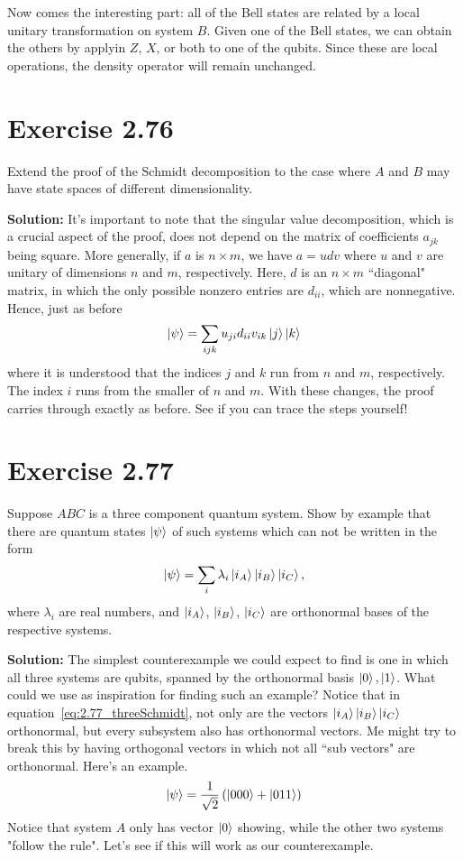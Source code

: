 \documentclass{book}
\begin{document}
    Now comes the interesting part: all of the Bell states are related by a local unitary transformation on system $B$. Given one of the Bell states, we can obtain the others by applyin $Z$, $X$, or both to one of the qubits. Since these are local operations, the density operator will remain unchanged. 

\section*{Exercise 2.76}
    Extend the proof of the Schmidt decomposition to the case where $A$ and $B$ may have state spaces of different dimensionality. 

    \textbf{Solution:} It's important to note that the singular value decomposition, which is a crucial aspect of the proof, does not depend on the matrix of coefficients $a_{jk}$ being square. More generally, if $a$ is $n \times m$, we have $a = udv$ where $u$ and $v$ are unitary of dimensions $n$ and $m$, respectively. Here, $d$ is an $n \times m$ ``diagonal" matrix, in which the only possible nonzero entries are $d_{ii}$, which are nonnegative. Hence, just as before
    \begin{align}
        \ket{\psi} = \sum_{ijk} u_{ji} d_{ii} v_{ik} \ket{j}\ket{k}
    \end{align}
    where it is understood that the indices $j$ and $k$ run from $n$ and $m$, respectively. The index $i$ runs from the smaller of $n$ and $m$. With these changes, the proof carries through exactly as before. See if you can trace the steps yourself!

\section*{Exercise 2.77}
    Suppose $ABC$ is a three component quantum system. Show by example that there are quantum states $\ket{\psi}$ of such systems which can not be written in the form
    \begin{align} \label{eq:2.77_threeSchmidt}
        \ket{\psi} = \sum_{i} \lambda_i \ket{i_A} \ket{i_B}\ket{i_C},
    \end{align}
    where $\lambda_i$ are real numbers, and $\ket{i_A}$, $\ket{i_B}$, $\ket{i_C}$ are orthonormal bases of the respective systems.

    \textbf{Solution:} The simplest counterexample we could expect to find is one in which all three systems are qubits, spanned by the orthonormal basis $\ket{0}, \ket{1}$. What could we use as inspiration for finding such an example? Notice that in equation~\eqref{eq:2.77_threeSchmidt}, not only are the vectors $\ket{i_A} \ket{i_B}\ket{i_C}$ orthonormal, but every subsystem also has orthonormal vectors. Me might try to break this by having orthogonal vectors in which not all ``sub vectors" are orthonormal. Here's an example.
    \begin{align} \label{eq:2.77counterexample}
        \ket{\psi} = \frac{1}{\sqrt{2}} \left(\ket{000} + \ket{011}\right)
    \end{align}
    Notice that system $A$ only has vector $\ket{0}$ showing, while the other two systems "follow the rule". Let's see if this will work as our counterexample. 
\end{document}
